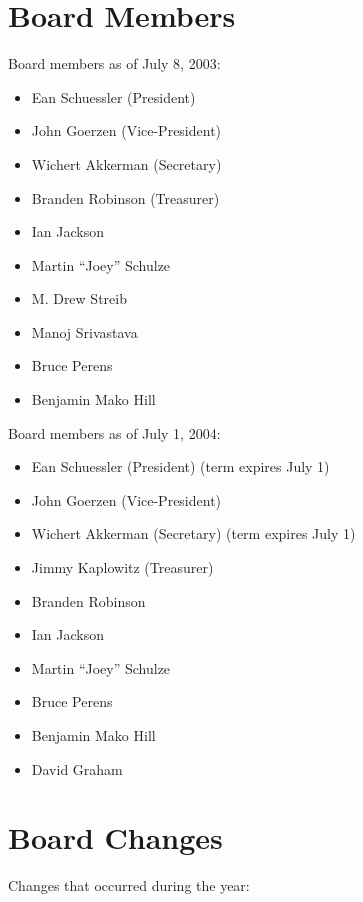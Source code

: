 \documentclass[letterpaper]{report}
\begin{document}
\section{Board Members}

Board members as of July 8, 2003:

\begin{itemize}
\item Ean Schuessler (President)
\item John Goerzen (Vice-President)
\item Wichert Akkerman (Secretary)
\item Branden Robinson (Treasurer)
\item Ian Jackson
\item Martin ``Joey'' Schulze
\item M. Drew Streib
\item Manoj Srivastava
\item Bruce Perens
\item Benjamin Mako Hill
\end{itemize}

Board members as of July 1, 2004:

\begin{itemize}
\item Ean Schuessler (President) (term expires July 1)
\item John Goerzen (Vice-President)
\item Wichert Akkerman (Secretary) (term expires July 1)
\item Jimmy Kaplowitz (Treasurer)
\item Branden Robinson
\item Ian Jackson
\item Martin ``Joey'' Schulze
\item Bruce Perens
\item Benjamin Mako Hill
\item David Graham
\end{itemize}

\section{Board Changes}

Changes that occurred during the year:
\end{document}
